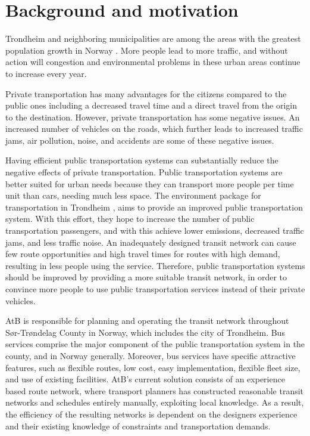 \section{Background and motivation}
\label{sec:backgroundAndMotivation}

Trondheim and neighboring municipalities are among the areas with the greatest population growth in Norway \citep{website:miljopakken}. More people lead to more traffic, and without action will congestion and environmental problems in these urban areas continue to increase every year. 

Private transportation has many advantages for the citizens compared to the public ones including a decreased travel time and a direct travel from the origin to the destination. However, private transportation has some negative issues. An increased number of vehicles on the roads, which further leads to increased traffic jams, air pollution, noise, and accidents are some of these negative issues. 

Having efficient public transportation systems can substantially reduce the negative effects of private transportation. Public transportation systems are better suited for urban needs because they can transport more people per time unit than cars, needing much less space. The environment package for transportation in Trondheim \citep{website:miljopakken}, aims to provide an improved public transportation system. With this effort, they hope to increase the number of public transportation passengers, and with this achieve lower emissions, decreased traffic jams, and less traffic noise. An inadequately designed transit network can cause few route opportunities and high travel times for routes with high demand, resulting in less people using the service. Therefore, public transportation systems should be improved by providing a more suitable transit network, in order to convince more people to use public transportation services instead of their private vehicles.

AtB \citep{website:atb} is responsible for planning and operating the transit network throughout Sør-Trøndelag County in Norway, which includes the city of Trondheim.  Bus services comprise the major component of the public transportation system in the county, and in Norway generally. Moreover, bus services have specific attractive features, such as flexible routes, low cost, easy implementation, flexible fleet size, and use of existing facilities. AtB's current solution consists of an experience based route network, where transport planners has constructed reasonable transit networks and schedules entirely manually, exploiting local knowledge. As a result, the efficiency of the resulting networks is dependent on the designers experience and their existing knowledge of constraints and transportation demands.

